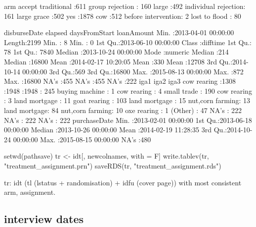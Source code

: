 \begin{Schunk}
\begin{Soutput}
                  arm                       accept    
 traditional        :611   group rejection     : 160  
 large              :492   individual rejection: 161  
 large grace        :502   yes                 :1878  
 cow                :512                              
 before intervention:  2                              
 lost to flood      : 80                              
                                                      
  disburseDate                   elapsed         daysFromStart   loanAmount   
 Min.   :2013-04-01 00:00:00   Length:2199       Min.   :  8   Min.   :    0  
 1st Qu.:2013-06-10 00:00:00   Class :difftime   1st Qu.: 78   1st Qu.: 7840  
 Median :2013-10-24 00:00:00   Mode  :numeric    Median :214   Median :16800  
 Mean   :2014-02-17 10:20:05                     Mean   :330   Mean   :12708  
 3rd Qu.:2014-10-14 00:00:00                     3rd Qu.:569   3rd Qu.:16800  
 Max.   :2015-08-13 00:00:00                     Max.   :872   Max.   :16800  
 NA's   :455                                     NA's   :455   NA's   :222    
            iga1                    iga2                    iga3     
 cow rearing  :1308                   :1948                   :1948  
              : 245   buying machine  :   1   cow rearing     :   4  
 small trade  : 190   cow rearing     :   3   land mortgage   :  11  
 goat rearing : 103   land mortgage   :  15   nut,corn farming:  13  
 land mortgage:  84   nut,corn farming:  10   oxe rearing     :   1  
 (Other)      :  47   NA's            : 222   NA's            : 222  
 NA's         : 222                                                  
  purchaseDate                
 Min.   :2013-02-01 00:00:00  
 1st Qu.:2013-06-18 00:00:00  
 Median :2013-10-26 00:00:00  
 Mean   :2014-02-19 11:28:35  
 3rd Qu.:2014-10-24 00:00:00  
 Max.   :2015-08-15 00:00:00  
 NA's   :480                  
\end{Soutput}
\begin{Sinput}
setwd(pathsave)
tr <- idt[, newcolnames, with = F]
write.tablev(tr, "treatment_assignment.prn")
saveRDS(tr, "treatment_assignment.rds")
\end{Sinput}
\end{Schunk}
\textsf{tr: idt (tl (lstatus + randomisation) + idfu (cover page))} with most consistent arm, assignment.


\subsection{interview dates}

